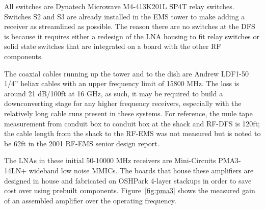 \documentclass[titlepage]{article}
\begin{document}
All switches are Dynatech Microwave M4-413K201L SP4T relay switches. Switches S2 and S3 are already installed in the EMS tower to make adding a receiver as streamlined as possible. The reason there are no switches at the DFS is because it requires either a redesign of the LNA housing to fit relay switches or solid state switches that are integrated on a board with the other RF components.

The coaxial cables running up the tower and to the dish are Andrew LDF1-50 1/4'' heliax cables with an upper frequency limit of 15800 MHz. The loss is around 21 dB/100ft at 16 GHz, as such, it may be required to build a downconverting stage for any higher frequency receivers, especially with the relatively long cable runs present in these systems. For reference, the mule tape measurement from conduit box to conduit box at the shack and RF-DFS is 120ft; the cable length from the shack to the RF-EMS was not measured but is noted to be 62ft in the 2001 RF-EMS senior design report.

The LNAs in these initial 50-10000 MHz receivers are Mini-Circuits PMA3-14LN+ wideband low noise MMICs. The boards that house these amplifiers are designed in house and fabricated on OSHPark 4-layer stackups in order to save cost over using prebuilt components. Figure~\ref{fig:pma3} shows the measured gain of an assembled amplifier over the operating frequency.
\end{document}
